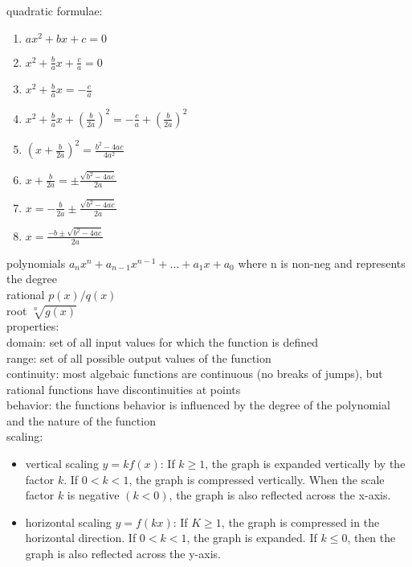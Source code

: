 \documentclass{article}
\begin{document}
quadratic formulae:
	\begin{enumerate}
		\item $ax^2 + bx + c = 0$
		\item $x^2 + \frac{b}{a}x + \frac{c}{a} = 0$
		\item $x^2 + \frac{b}{a}x = -\frac{c}{a}$
		\item $x^2 + \frac{b}{a}x + \left( \frac{b}{2a} \right)^2 = -\frac{c}{a} + \left( \frac{b}{2a} \right)^2$
		\item $\left( x + \frac{b}{2a} \right)^2 = \frac{b^2 - 4ac}{4a^2}$
		\item $x + \frac{b}{2a} = \pm \frac{\sqrt{b^2 - 4ac}}{2a}$
		\item $x = -\frac{b}{2a} \pm \frac{\sqrt{b^2 - 4ac}}{2a}$
		\item $x = \frac{-b \pm \sqrt{b^2 - 4ac}}{2a}$
	\end{enumerate}

polynomials $a_nx^n + a_{n-1}x^{n-1} + ... + a_1x + a_0$ where n is non-neg and represents the degree\\

rational $p(x)/q(x)$\\

root $\sqrt[n]{g(x)}$\\

properties:\\
	domain: set of all input values for which the function is defined\\
	range: set of all possible output values of the function\\
	
	continuity: most algebaic functions are continuous (no breaks of jumps), but rational functions have discontinuities at points\\
		
	behavior: the functions behavior is influenced by the degree of the polynomial and the nature of the function\\


	scaling:
		\begin{itemize}
			\item{vertical scaling} $y = kf(x)$: If $k \geq 1$, the graph is expanded vertically by the factor $k$. If $0 < k < 1$, the graph is compressed vertically. When the scale factor $k$ is negative $(k < 0)$, the graph is also reflected across the x-axis.
			\item{horizontal scaling} $y = f(kx)$: If $K \geq 1$, the graph is compressed in the horizontal direction. If $0 < k < 1$, the graph is expanded. If $k \leq 0$, then the graph is also reflected across the y-axis.
		\end{itemize}
\end{document}
